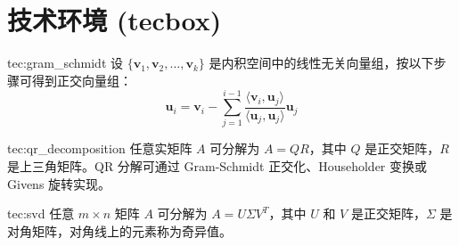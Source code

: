 \section{技术环境 (tecbox)}

\begin{tecbox}{tec:gram_schmidt}
设 \( \{ \mathbf{v}_1, \mathbf{v}_2, \dots, \mathbf{v}_k \} \) 是内积空间中的线性无关向量组，按以下步骤可得到正交向量组：
\[
\mathbf{u}_i = \mathbf{v}_i - \sum_{j=1}^{i-1} \frac{\langle \mathbf{v}_i, \mathbf{u}_j \rangle}{\langle \mathbf{u}_j, \mathbf{u}_j \rangle} \mathbf{u}_j
\]
\end{tecbox}

\begin{tecbox}[QR 分解]{tec:qr_decomposition}
任意实矩阵 \( A \) 可分解为 \( A = QR \)，其中 \( Q \) 是正交矩阵，\( R \) 是上三角矩阵。QR 分解可通过 Gram-Schmidt 正交化、Householder 变换或 Givens 旋转实现。
\end{tecbox}

\begin{tecbox}[奇异值分解]{tec:svd}
任意 \( m \times n \) 矩阵 \( A \) 可分解为 \( A = U\Sigma V^T \)，其中 \( U \) 和 \( V \) 是正交矩阵，\( \Sigma \) 是对角矩阵，对角线上的元素称为奇异值。
\end{tecbox}